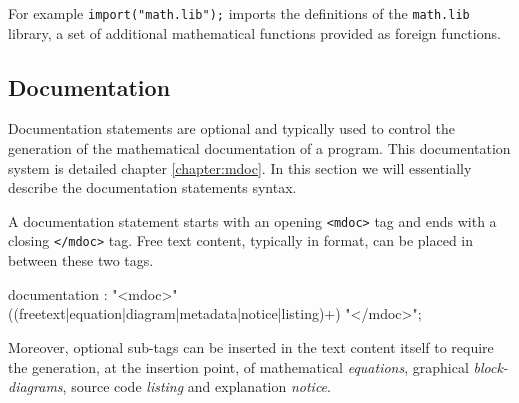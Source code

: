 \documentclass[a4paper,10pt]{book}
\begin{document}
For example \lstinline{import("math.lib");} imports the definitions of the \lstinline{math.lib} library, a set of additional mathematical functions provided as foreign functions.


\subsection{Documentation}
\label{sec:documentation}

Documentation statements are optional and typically used to control the generation of the mathematical documentation of a \faust program. This documentation system is detailed chapter \ref{chapter:mdoc}. In this section we will essentially describe the documentation statements syntax.

A documentation statement starts with an opening \lstinline'<mdoc>' tag and ends with a closing \lstinline'</mdoc>' tag. Free text content, typically in \latex format, can be placed in between these two tags. 


\begin{rail}
documentation : "<mdoc>" ((freetext|equation|diagram|metadata|notice|listing)+) "</mdoc>";
\end{rail}


Moreover, optional sub-tags can be inserted in the text content itself to require the generation, at the insertion point, of mathematical \textit{equations}, graphical \textit{block-diagrams}, \faust source code \textit{listing} and explanation \textit{notice}.

\end{document}
